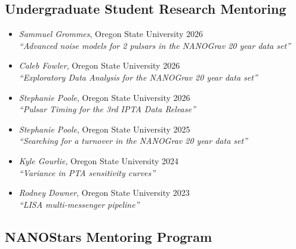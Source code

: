 \documentclass[11pt,letterpaper,sans,unicode]{moderncv}
\newcommand{\studentitem}[4]{\item \textit{#1}, {#2} \hfill{#3} \\ \textit{``#4''} } %
\newcommand{\blucirc}{{\color{color1} $\circ\;\;$}}
\begin{document}
{%



\subsection{Undergraduate Student Research Mentoring}
\renewcommand\labelitemi{\blucirc}
\begin{itemize}[leftmargin=8mm]
\studentitem{Sammuel Grommes}{Oregon State University}{2026}{Advanced noise models for 2 pulsars in the NANOGrav 20 year data set}
\studentitem{Caleb Fowler}{Oregon State University}{2026}{Exploratory Data Analysis for the NANOGrav 20 year data set}
\studentitem{Stephanie Poole}{Oregon State University}{2026}{Pulsar Timing for the 3rd IPTA Data Release}
\studentitem{Stephanie Poole}{Oregon State University}{2025}{Searching for a turnover in the NANOGrav 20 year data set}
\studentitem{Kyle Gourlie}{Oregon State University}{2024}{Variance in PTA sensitivity curves}
\studentitem{Rodney Downer}{Oregon State University}{2023}{LISA multi-messenger pipeline}
\end{itemize}

\subsection{NANOStars Mentoring Program}
\vspace{-0.1cm}


}
\end{document}
